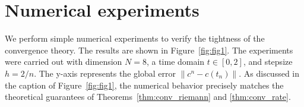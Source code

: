 \documentclass{article}
\theoremstyle{definition}
\begin{document}
\section{Numerical experiments}
We perform simple numerical experiments to verify the tightness of the convergence theory. The results are shown in Figure~\ref{fig:fig1}. The experiments were carried out with dimension $N = 8$, a time domain $t \in [0, 2]$, and stepsize $h = 2/n$. The y-axis represents the global error $
\|c^n-c(t_n)\|$.
As discussed in the caption of Figure~\ref{fig:fig1}, the numerical behavior precisely matches the theoretical guarantees of Theorems~\ref{thm:conv_riemann} and \ref{thm:conv_rate}.




\end{document}
